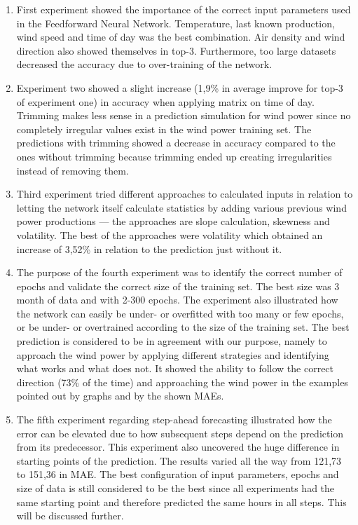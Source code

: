 \begin{enumerate}
\item First experiment showed the importance of the correct input parameters used in the Feedforward Neural Network. Temperature, last known production, wind speed and time of day was the best combination. Air density and wind direction also showed themselves in top-3. Furthermore, too large datasets decreased the accuracy due to over-training of the network.
\item Experiment two showed a slight increase (1,9\% in average improve for top-3 of experiment one) in accuracy when applying matrix on time of day. Trimming makes less sense in a prediction simulation for wind power since no completely irregular values exist in the wind power training set. The predictions with trimming showed a decrease in accuracy compared to the ones without trimming because trimming ended up creating irregularities instead of removing them.
\item Third experiment tried different approaches to calculated inputs in relation to letting the network itself calculate statistics by adding various previous wind power productions --- the approaches are slope calculation, skewness and volatility. The best of the approaches were volatility which obtained an increase of 3,52\% in relation to the prediction just without it.
\item The purpose of the fourth experiment was to identify the correct number of epochs and validate the correct size of the training set. The best size was 3 month of data and with 2-300 epochs. The experiment also illustrated how the network can easily be under- or overfitted with too many or few epochs, or be under- or overtrained  according to the size of the training set. The best prediction is considered to be in agreement with our purpose, namely to approach the wind power by applying different strategies and identifying what works and what does not. It showed the ability to follow the correct direction (73\% of the time) and approaching the wind power in the examples pointed out by graphs and by the shown MAEs.	
\item The fifth experiment regarding step-ahead forecasting illustrated how the error can be elevated due to how subsequent steps depend on the prediction from its predecessor. This experiment also uncovered the huge difference in starting points of the prediction. The results varied all the way from 121,73 to 151,36 in MAE. The best configuration of input parameters, epochs and size of data is still considered to be the best since all experiments had the same starting point and therefore predicted the same hours in all steps. This will be discussed further.
\end{enumerate}

